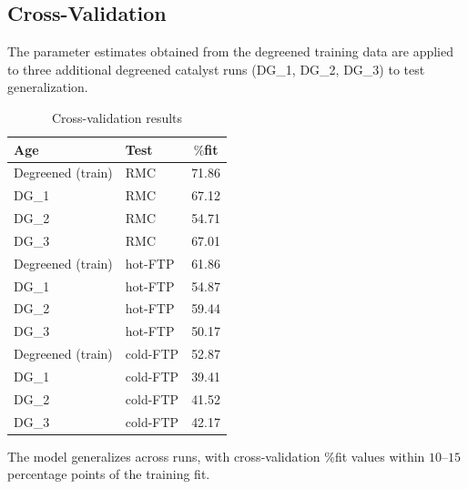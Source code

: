 \subsection{Cross-Validation \label{sec::cross_valid}}

The parameter estimates obtained from the degreened training data are applied to three additional degreened catalyst runs
(DG\_1, DG\_2, DG\_3) to test generalization.

\begin{table}[!ht]
    \centering
    \caption{Cross-validation results}
    \label{tab::cross_valid}
    \begin{tabular}{l l c}
        \hline \hline
        Age & Test & $\%$fit \\
        \hline \hline
        Degreened (train) & RMC      & 71.86 \\
        DG\_1             & RMC      & 67.12 \\
        DG\_2             & RMC      & 54.71 \\
        DG\_3             & RMC      & 67.01 \\ \hline
        Degreened (train) & hot-FTP  & 61.86 \\
        DG\_1             & hot-FTP  & 54.87 \\
        DG\_2             & hot-FTP  & 59.44 \\
        DG\_3             & hot-FTP  & 50.17 \\ \hline
        Degreened (train) & cold-FTP & 52.87 \\
        DG\_1             & cold-FTP & 39.41 \\
        DG\_2             & cold-FTP & 41.52 \\
        DG\_3             & cold-FTP & 42.17 \\
        \hline \hline
    \end{tabular}
\end{table}

The model generalizes across runs, with cross-validation $\%$fit values within $10$--$15$ percentage points of the
training fit.
